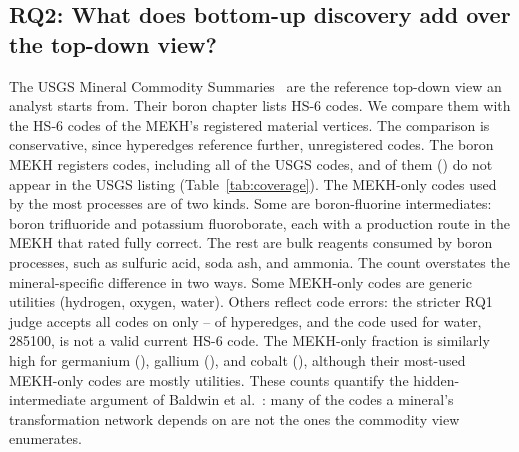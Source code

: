 \subsection{RQ2: What does bottom-up discovery add over the top-down view?}
The USGS Mineral Commodity Summaries~\cite{usgsmcs2025} are the reference top-down view an analyst starts from. Their boron chapter lists \CoverageUsgsBoron{} HS-6 codes. We compare them with the HS-6 codes of the MEKH's registered material vertices. The comparison is conservative, since hyperedges reference further, unregistered codes. The boron MEKH registers \CoverageMekhBoron{} codes, including all of the USGS codes, and \CoverageMekhOnlyBoron{} of them (\CoverageFracBoron{}) do not appear in the USGS listing (Table~\ref{tab:coverage}). The MEKH-only codes used by the most processes are of two kinds. Some are boron-fluorine intermediates: boron trifluoride and potassium fluoroborate, each with a production route in the MEKH that \JudgeAName{} rated fully correct. The rest are bulk reagents consumed by boron processes, such as sulfuric acid, soda ash, and ammonia. The count overstates the mineral-specific difference in two ways. Some MEKH-only codes are generic utilities (hydrogen, oxygen, water). Others reflect code errors: the stricter RQ1 judge accepts all codes on only \JudgeHSClaudeMin{}--\JudgeHSClaudeMax{} of hyperedges, and the code used for water, 285100, is not a valid current HS-6 code. The MEKH-only fraction is similarly high for germanium (\CoverageFracGermanium{}), gallium (\CoverageFracGallium{}), and cobalt (\CoverageFracCobalt{}), although their most-used MEKH-only codes are mostly utilities. These counts quantify the hidden-intermediate argument of Baldwin et al.~\cite{baldwin2023hidden}: many of the codes a mineral's transformation network depends on are not the ones the commodity view enumerates.

